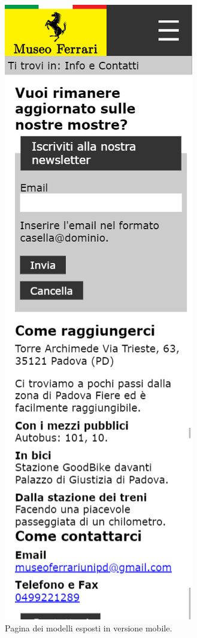 \begin{figure}[H]
	\begin{center}
		\includegraphics[scale=.3]{Images/infoContatti_mobile.png}
		\caption{Pagina dei modelli esposti in versione mobile.}
	\end{center}
\end{figure}


